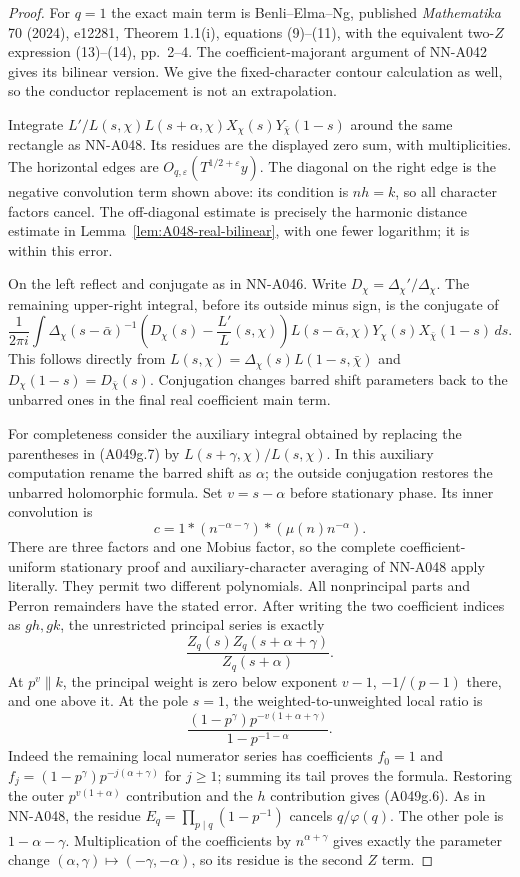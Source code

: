 \begin{proof}
For $q=1$ the exact main term is Benli--Elma--Ng, published
\emph{Mathematika} 70 (2024), e12281, Theorem 1.1(i), equations
(9)--(11), with the equivalent two-$Z$ expression (13)--(14),
pp.~2--4. The coefficient-majorant argument of NN-A042 gives its
bilinear version. We give the fixed-character contour calculation
as well, so the conductor replacement is not an extrapolation.

Integrate $L'/L(s,\chi)L(s+\alpha,\chi)X_\chi(s)
Y_{\bar\chi}(1-s)$ around the same rectangle as NN-A048.
Its residues are the displayed zero sum, with multiplicities. The
horizontal edges are $O_{q,\varepsilon}(T^{1/2+\varepsilon}y)$.
The diagonal on the right edge is the negative convolution term
shown above: its condition is $nh=k$, so all character factors
cancel. The off-diagonal estimate is precisely the harmonic
distance estimate in Lemma~\ref{lem:A048-real-bilinear}, with one
fewer logarithm; it is within this error.

On the left reflect and conjugate as in NN-A046. Write
$D_\chi=\Delta_\chi'/\Delta_\chi$. The remaining upper-right
integral, before its outside minus sign, is the conjugate of
\[
 \frac1{2\pi i}\int
  \Delta_\chi(s-\bar\alpha)^{-1}
  \left(D_\chi(s)-\frac{L'}L(s,\chi)\right)
  L(s-\bar\alpha,\chi)
  Y_\chi(s)X_{\bar\chi}(1-s)\,ds.
\tag{A049g.7}
\]
This follows directly from $L(s,\chi)=\Delta_\chi(s)
L(1-s,\bar\chi)$ and
$D_\chi(1-s)=D_{\bar\chi}(s)$. Conjugation changes barred
shift parameters back to the unbarred ones in the final real
coefficient main term.

For completeness consider the auxiliary integral obtained by
replacing the parentheses in (A049g.7) by
$L(s+\gamma,\chi)/L(s,\chi)$. In this auxiliary computation
rename the barred shift as $\alpha$; the outside conjugation
restores the unbarred holomorphic formula. Set $v=s-\alpha$ before
stationary phase. Its inner convolution is
\[
 c=1*(n^{-\alpha-\gamma})*(\mu(n)n^{-\alpha}).
\]
There are three factors and one Mobius factor, so the complete
coefficient-uniform stationary proof and auxiliary-character
averaging of NN-A048 apply literally. They permit two different
polynomials. All nonprincipal parts and Perron remainders have
the stated error. After writing the two coefficient indices as
$gh,gk$, the unrestricted principal series is exactly
\[
                \frac{Z_q(s)Z_q(s+\alpha+\gamma)}{Z_q(s+\alpha)}.
\tag{A049g.8}
\]
At $p^v\parallel k$, the principal weight is zero below exponent
$v-1$, $-1/(p-1)$ there, and one above it. At the pole $s=1$,
the weighted-to-unweighted local ratio is
\[
       \frac{(1-p^\gamma)p^{-v(1+\alpha+\gamma)}}
                                      {1-p^{-1-\alpha}}.
\]
Indeed the remaining local numerator series has coefficients
$f_0=1$ and $f_j=(1-p^\gamma)p^{-j(\alpha+\gamma)}$ for
$j\ge1$; summing its tail proves the formula. Restoring the
outer $p^{v(1+\alpha)}$ contribution and the $h$ contribution
gives (A049g.6). As in NN-A048, the residue
$E_q=\prod_{p\mid q}(1-p^{-1})$ cancels $q/\varphi(q)$.
The other pole is $1-\alpha-\gamma$. Multiplication of the
coefficients by $n^{\alpha+\gamma}$ gives exactly the parameter
change $(\alpha,\gamma)\mapsto(-\gamma,-\alpha)$, so its
residue is the second $Z$ term.


\end{proof}

